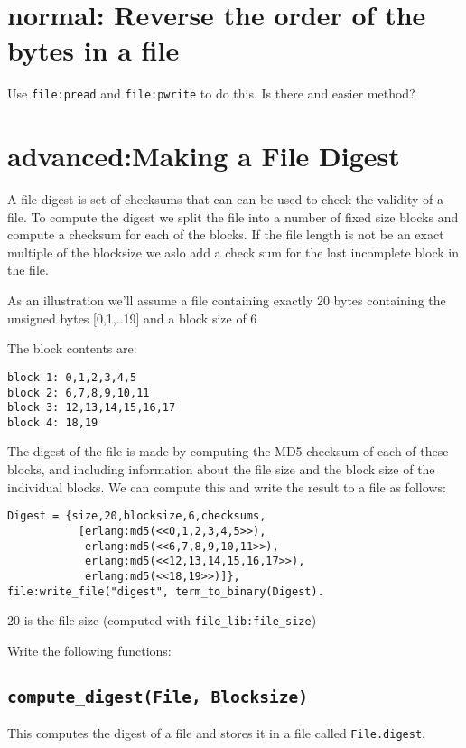 \documentclass[12pt]{hitec}
\begin{document}
\section{normal: Reverse the order of the bytes in a file}

Use \verb+file:pread+ and \verb+file:pwrite+ to do this. Is there and easier method?

\section{advanced:Making a File Digest}

A file digest is set of checksums that can can be used to check the 
validity of a file. To compute the digest we split the file into a
number of fixed size blocks and compute a checksum for each of the blocks.
If the file length is not be an exact multiple of the blocksize we aslo add
a check sum for the last incomplete block in the file.

As an illustration we'll assume a file containing exactly 20 bytes
containing the unsigned bytes [0,1,..19] and a block size of 6

The block contents are:

\begin{verbatim}
block 1: 0,1,2,3,4,5
block 2: 6,7,8,9,10,11
block 3: 12,13,14,15,16,17
block 4: 18,19
\end{verbatim}

The digest of the file is made by computing the MD5 checksum of each of these
blocks, and including information about the file size and the block size of the
individual blocks. We can compute this and write the result to a file as follows:

\begin{verbatim}
Digest = {size,20,blocksize,6,checksums, 
           [erlang:md5(<<0,1,2,3,4,5>>),
            erlang:md5(<<6,7,8,9,10,11>>),
            erlang:md5(<<12,13,14,15,16,17>>),
            erlang:md5(<<18,19>>)]},
file:write_file("digest", term_to_binary(Digest).
\end{verbatim}

20 is the file size (computed with \verb+file_lib:file_size+)

Write the following functions:

\subsection{\texttt{compute\_digest(File, Blocksize)}}
This computes the digest of a file and stores it in a file called 
\verb+File.digest+.
\end{document}
